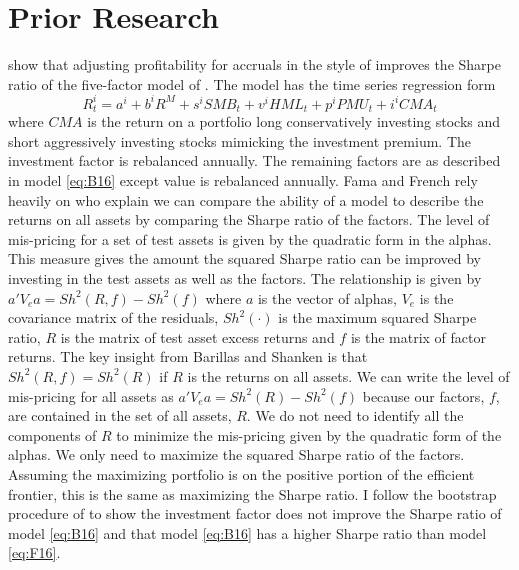 
\section*{Prior Research}

\textcite{fama2016choosing} show that adjusting profitability for accruals in
the style of \textcite{ball2016accruals} improves the Sharpe ratio of the
five-factor model of \textcite{fama2015five}.
The model has the time series regression form
\begin{equation} \label{eq:F16}
R_t^i = a^i+b^iR^M+s^iSMB_t+v^iHML_t+p^iPMU_t+i^iCMA_t
\end{equation}
where $CMA$ is the return on a portfolio long conservatively investing stocks
and short aggressively investing stocks mimicking the investment premium.
The investment factor is rebalanced annually.
The remaining factors are as described in model \ref{eq:B16} except value is
rebalanced annually.
Fama and French rely heavily on \textcite{barillas2016alpha} who explain we can
compare the ability of a model to describe the returns on all assets by
comparing the Sharpe ratio of the factors.
The level of mis-pricing for a set of test assets is given by the quadratic
form in the alphas.
This measure gives the amount the squared Sharpe ratio can be improved by
investing in the test assets as well as the factors.
The relationship is given by
$a'V_ea=Sh^2\left(R,f\right)-Sh^2\left(f\right)$
where $a$ is the vector of alphas,
$V_e$ is the covariance matrix of the residuals,
$Sh^2\left(\cdot\right)$ is the maximum squared Sharpe ratio,
$R$ is the matrix of test asset excess returns and $f$ is the matrix of factor
returns.
The key insight from Barillas and Shanken is that
$Sh^2\left(R,f\right)=Sh^2\left(R\right)$ if $R$ is the returns on all assets.
We can write the level of mis-pricing for all assets as
$a'V_ea=Sh^2\left(R\right)-Sh^2\left(f\right)$ because our factors, $f$, are
contained in the set of all assets, $R$.
We do not need to identify all the components of $R$ to minimize the
mis-pricing given by the quadratic form of the alphas.
We only need to maximize the squared Sharpe ratio of the factors.
Assuming the maximizing portfolio is on the positive portion of the efficient
frontier, this is the same as maximizing the Sharpe ratio.
I follow the bootstrap procedure of \textcite{fama2016choosing} to show the
investment factor does not improve the Sharpe ratio of model \ref{eq:B16} and
that model \ref{eq:B16} has a higher Sharpe ratio than model \ref{eq:F16}.

